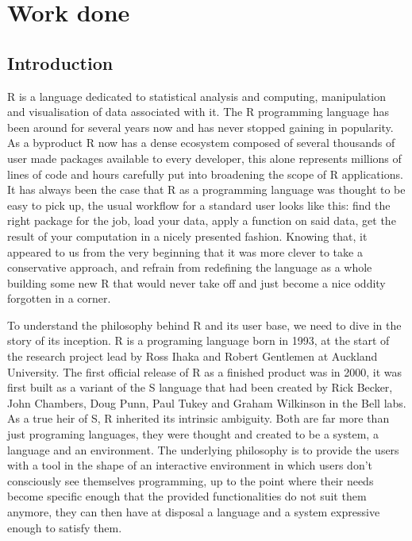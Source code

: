 
\chapter{Work done}

\section{Introduction}

R is a language dedicated to statistical analysis and computing, manipulation and visualisation of data associated with it. The R programming language has been around for several years now and has never stopped gaining in popularity. As a byproduct R now has a dense ecosystem composed of several thousands of user made packages available to every developer, this alone represents millions of lines of code and hours carefully put into broadening the scope of R applications. It has always been the case that R as a programming language was thought to be easy to pick up, the usual workflow for a standard user looks like this: find the right package for the job, load your data, apply a function on said data, get the result of your computation in a nicely presented fashion.
Knowing that, it appeared to us from the very beginning that it was more clever to take a conservative approach, and refrain from redefining the language as a whole building some new R that would never take off and just become a nice oddity forgotten in a corner.


To understand the philosophy behind R and its user base, we need to dive in the story of its inception. R is a programing language born in 1993, at the start of the research project lead by Ross Ihaka and Robert Gentlemen at Auckland University. The first official release of R as a finished product was in 2000, it was first built as a variant of the S language that had been created by Rick Becker, John Chambers, Doug Punn, Paul Tukey and Graham Wilkinson in the Bell labs.
As a true heir of S, R inherited its intrinsic ambiguity. Both are far more than just programing languages, they were thought and created to be a system, a language and an environment. The underlying philosophy is to provide the users with a tool in the shape of an interactive environment in which users  don't consciously see themselves programming, up to the point where their needs become specific enough that the provided functionalities do not suit them anymore, they can then have at disposal a language and a system expressive enough to satisfy them.


